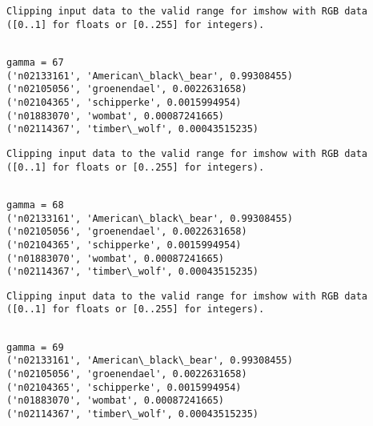\documentclass[11pt]{article}
\begin{document}
    \begin{Verbatim}[commandchars=\\\{\}]
Clipping input data to the valid range for imshow with RGB data ([0..1] for floats or [0..255] for integers).

    \end{Verbatim}

    \begin{Verbatim}[commandchars=\\\{\}]

gamma = 67
('n02133161', 'American\_black\_bear', 0.99308455)
('n02105056', 'groenendael', 0.0022631658)
('n02104365', 'schipperke', 0.0015994954)
('n01883070', 'wombat', 0.00087241665)
('n02114367', 'timber\_wolf', 0.00043515235)

    \end{Verbatim}

    \begin{Verbatim}[commandchars=\\\{\}]
Clipping input data to the valid range for imshow with RGB data ([0..1] for floats or [0..255] for integers).

    \end{Verbatim}

    \begin{Verbatim}[commandchars=\\\{\}]

gamma = 68
('n02133161', 'American\_black\_bear', 0.99308455)
('n02105056', 'groenendael', 0.0022631658)
('n02104365', 'schipperke', 0.0015994954)
('n01883070', 'wombat', 0.00087241665)
('n02114367', 'timber\_wolf', 0.00043515235)

    \end{Verbatim}

    \begin{Verbatim}[commandchars=\\\{\}]
Clipping input data to the valid range for imshow with RGB data ([0..1] for floats or [0..255] for integers).

    \end{Verbatim}

    \begin{Verbatim}[commandchars=\\\{\}]

gamma = 69
('n02133161', 'American\_black\_bear', 0.99308455)
('n02105056', 'groenendael', 0.0022631658)
('n02104365', 'schipperke', 0.0015994954)
('n01883070', 'wombat', 0.00087241665)
('n02114367', 'timber\_wolf', 0.00043515235)

    \end{Verbatim}
\end{document}
